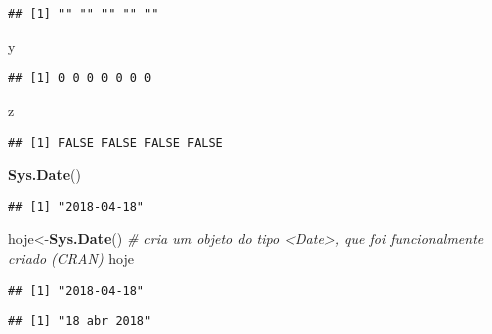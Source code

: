 \documentclass[]{article}
\newenvironment{Shaded}{\begin{snugshade}}{\end{snugshade}}
\newcommand{\KeywordTok}[1]{\textcolor[rgb]{0.13,0.29,0.53}{\textbf{#1}}}
\newcommand{\StringTok}[1]{\textcolor[rgb]{0.31,0.60,0.02}{#1}}
\newcommand{\CommentTok}[1]{\textcolor[rgb]{0.56,0.35,0.01}{\textit{#1}}}
\newcommand{\NormalTok}[1]{#1}
\begin{document}
\begin{verbatim}
## [1] "" "" "" "" ""
\end{verbatim}

\begin{Shaded}
\begin{Highlighting}[]
\NormalTok{y}
\end{Highlighting}
\end{Shaded}

\begin{verbatim}
## [1] 0 0 0 0 0 0 0
\end{verbatim}

\begin{Shaded}
\begin{Highlighting}[]
\NormalTok{z}
\end{Highlighting}
\end{Shaded}

\begin{verbatim}
## [1] FALSE FALSE FALSE FALSE
\end{verbatim}

\begin{Shaded}
\begin{Highlighting}[]
\KeywordTok{Sys.Date}\NormalTok{()}
\end{Highlighting}
\end{Shaded}

\begin{verbatim}
## [1] "2018-04-18"
\end{verbatim}

\begin{Shaded}
\begin{Highlighting}[]
\NormalTok{hoje<-}\KeywordTok{Sys.Date}\NormalTok{() }\CommentTok{# cria um objeto do tipo <Date>, que foi funcionalmente criado (CRAN)}
\NormalTok{hoje}
\end{Highlighting}
\end{Shaded}

\begin{verbatim}
## [1] "2018-04-18"
\end{verbatim}

\begin{Shaded}
\end{Shaded}

\begin{verbatim}
## [1] "18 abr 2018"
\end{verbatim}
\end{document}

